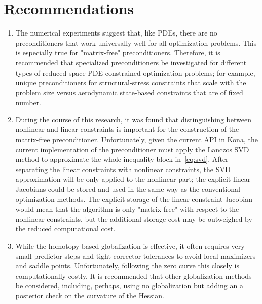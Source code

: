 
\section{Recommendations}

\begin{enumerate}

\item The numerical experiments suggest that, like PDEs, there are no preconditioners that work universally well for all optimization problems.  This is especially true for "matrix-free" preconditioners.  Therefore, it is recommended that specialized preconditioners be investigated for different types of reduced-space PDE-constrained optimization problems; for example, unique preconditioners for structural-stress constraints that scale with the problem size versus aerodynamic state-based constraints that are of fixed number.

\item During the course of this research, it was found that distinguishing between nonlinear and linear constraints is important for the construction of the matrix-free preconditioner. 
Unfortunately, given the current API in Kona, the current implementation of the preconditioner must apply the Lanczos SVD method to approximate the whole inequality block in~\ref{eq:svd}, 
After separating the linear constraints with nonlinear constraints, the SVD
approximation will be only applied to the nonlinear part; the explicit linear Jacobians could be stored and used in the same way as the conventional optimization methods. 
The explicit storage of the linear constraint Jacobian would mean that the algorithm is only "matrix-free" with respect to the nonlinear constraints, but the additional storage cost may be outweighed by the reduced computational cost. 

\item While the homotopy-based globalization is effective, it often requires very small predictor steps and tight corrector tolerances to avoid local maximizers and saddle points.  Unfortunately, following the zero curve this closely is computationally costly.  It is recommended that other globalization methods be considered, including, perhaps, using no globalization but adding an a posterior check on the curvature of the Hessian. 


\end{enumerate}
